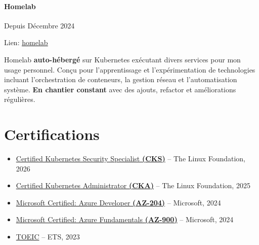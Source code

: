 \documentclass{article}
\begin{document}
\paragraph{Homelab} \hspace*{\fill}Depuis Décembre 2024

Lien: \href{https://issamsisbane.github.io/portfolio/fr/blog/homelab---1---setup/}{\underline{homelab}}

\vspace{\baselineskip}

Homelab \textbf{auto-hébergé} sur Kubernetes exécutant divers services pour mon usage personnel. Conçu pour l'apprentissage et l'expérimentation de technologies incluant l'orchestration de conteneurs, la gestion réseau et l'automatisation système. \textbf{En chantier constant} avec des ajouts, refactor et améliorations régulières.

\vspace{\baselineskip}

\vspace{2ex}
\hrulefill

\section*{Certifications}
\begin{itemize}
  \item \href{https://www.credly.com/badges/313586a1-4d6b-4370-806a-c16ae2d5a650/public_url}{Certified Kubernetes Security Specialist \textbf{(CKS)}} – The Linux Foundation, 2026
  \item \href{https://www.credly.com/badges/0cbcbdda-468f-40c1-91a7-465114ff60cb/public_url}{Certified Kubernetes Administrator \textbf{(CKA)}} – The Linux Foundation, 2025
  \item \href{https://learn.microsoft.com/api/credentials/share/fr-fr/IssamSISBANE-4752/9BC1C0080C19DD38?sharingId=B40C0FD0BE50D583}{Microsoft Certified: Azure Developer \textbf{(AZ-204)}} – Microsoft, 2024
  \item \href{https://learn.microsoft.com/api/credentials/share/fr-fr/IssamSISBANE-4752/32A02BF61E6E5685?sharingId=B40C0FD0BE50D583}{Microsoft Certified: Azure Fundamentals \textbf{(AZ-900)}} – Microsoft, 2024
  \item \href{https://drive.google.com/file/d/1DXkxWty0u_Zw_BTz6_u9F2je5KRt1Ffd/view}{TOEIC} – ETS, 2023
\end{itemize}
\end{document}
